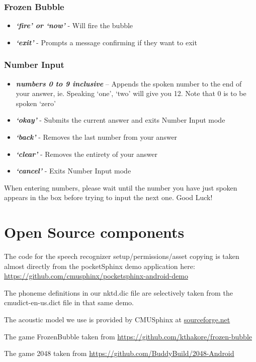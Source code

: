 \documentclass[11pt, oneside]{article}
\begin{document}
\subsubsection{Frozen Bubble}

\begin{itemize}
	\item {\em\bf`fire' or `now'} - Will fire the bubble
	\item {\em\bf`exit'} - Prompts a message confirming if they want to exit
	
\end{itemize}

\pagebreak

\subsubsection{Number Input}
\begin{itemize}
  \item {\em\bf numbers 0 to 9 inclusive} – Appends the spoken number
    to the end of your answer, ie. Speaking `one', `two' will give you
    12. Note that 0 is to be spoken `zero'
  \item {\em\bf `okay'} - Submits the current answer and exits Number
    Input mode
  \item {\em\bf `back'} - Removes the last number from your answer
  \item {\em\bf `clear'} - Removes the entirety of your answer
  \item {\em\bf `cancel'} - Exits Number Input mode
\end{itemize}

When entering numbers, please wait until the number you have just spoken appears
in the box before trying to input the next one.
Good Luck!

\section{Open Source components}

The code for the speech recognizer setup/permissions/asset copying is
taken almost directly from the pocketSphinx demo application here:
\url{https://github.com/cmusphinx/pocketsphinx-android-demo}

The phoneme definitions in our nktd.dic file are selectively taken
from the cmudict-en-us.dict file in that same demo.

The acoustic model we use is provided by CMUSphinx at
\href{https://sourceforge.net/projects/cmusphinx/files/Acoustic\%20and\%20Language\%20Models/US\%20English/}{sourceforge.net}

The game FrozenBubble taken from
\url{https://github.com/kthakore/frozen-bubble}

The game 2048 taken from
\url{https://github.com/BuddyBuild/2048-Android}
    
\end{document}
